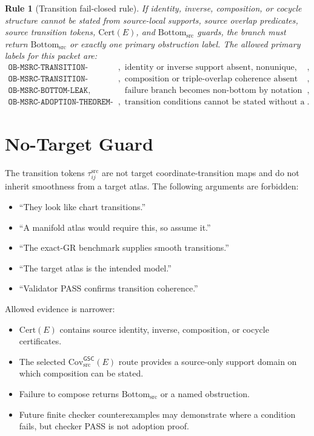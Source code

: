 \documentclass[11pt]{article}
\newcommand{\GSC}{\mathsf{GSC}}
\newcommand{\Bottomsrc}{\mathrm{Bottom}_{\mathrm{src}}}
\newcommand{\Covsrc}{\mathrm{Cov}_{\mathrm{src}}^{\GSC}}
\newtheorem{rulebox}{Rule}
\begin{document}
\begin{rulebox}[Transition fail-closed rule]
If identity, inverse, composition, or cocycle structure cannot be stated from
source-local supports, source overlap predicates, source transition tokens,
\(\mathrm{Cert}(E)\), and \(\Bottomsrc\) guards, the branch must return
\(\Bottomsrc\) or exactly one primary obstruction label. The allowed primary
labels for this packet are:
\[
\begin{array}{ll}
\texttt{OB-MSRC-TRANSITION-INVERSE-FAIL}, &
\text{identity or inverse support absent, nonunique, or degenerate},\\
\texttt{OB-MSRC-TRANSITION-COCYCLE-FAIL}, &
\text{composition or triple-overlap coherence absent or degenerate},\\
\texttt{OB-MSRC-BOTTOM-LEAK}, &
\text{failure branch becomes non-bottom by notation or process authority},\\
\texttt{OB-MSRC-ADOPTION-THEOREM-UNFORMED}, &
\text{transition conditions cannot be stated without a new primitive}.
\end{array}
\]
\end{rulebox}

\section{No-Target Guard}

The transition tokens \(\tau_{ij}^{\mathrm{src}}\) are not target
coordinate-transition maps and do not inherit smoothness from a target atlas.
The following arguments are forbidden:

\begin{itemize}
  \item ``They look like chart transitions.''
  \item ``A manifold atlas would require this, so assume it.''
  \item ``The exact-GR benchmark supplies smooth transitions.''
  \item ``The target atlas is the intended model.''
  \item ``Validator PASS confirms transition coherence.''
\end{itemize}

Allowed evidence is narrower:

\begin{itemize}
  \item \(\mathrm{Cert}(E)\) contains source identity, inverse, composition,
  or cocycle certificates.
  \item The selected \(\Covsrc(E)\) route provides a source-only support
  domain on which composition can be stated.
  \item Failure to compose returns \(\Bottomsrc\) or a named obstruction.
  \item Future finite checker counterexamples may demonstrate where a
  condition fails, but checker PASS is not adoption proof.
\end{itemize}
\end{document}
